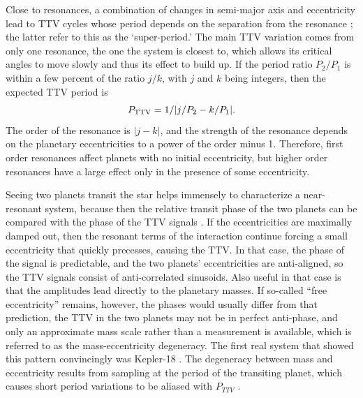 \documentclass[graybox,natbib,nosecnum]{svmult}
\begin{document}
Close to resonances, a combination of changes in semi-major axis and eccentricity lead to TTV cycles whose period depends on the separation from the resonance \citep{Steffen2006,2012ApJ...761..122L}; the latter refer to this as the `super-period.'  The main TTV variation comes from only one resonance, the one the system is closest to, which allows its critical angles to move slowly and thus its effect to build up.  If the period ratio $P_2/P_1$ is within a few percent of the ratio $j/k$, with $j$ and $k$ being integers, then the expected TTV period is 
\begin{equation}
P_{\rm TTV} = 1/|j/P_2-k/P_1|. \label{eqn:pttv}
\end{equation}
The order of the resonance is $|j-k|$, and the strength of the resonance depends on the planetary eccentricities to a power of the order minus 1.  Therefore, first order resonances affect planets with no initial eccentricity, but higher order resonances have a large effect only in the presence of some eccentricity. 

Seeing two planets transit the star helps immensely to characterize a near-resonant system, because then the relative transit phase of the two planets can be compared with the phase of the TTV signals \citep{2012ApJ...761..122L}.  If the eccentricities are maximally damped out, then the resonant terms of the interaction continue forcing a small eccentricity that quickly precesses, causing the TTV.  In that case, the phase of the signal is predictable, and the two planets' eccentricities are anti-aligned, so the TTV signals consist of anti-correlated sinusoids.  Also useful in that case is that the amplitudes lead directly to the planetary masses.  If so-called ``free eccentricity'' remains, however, the phases would usually differ from that prediction, the TTV in the two planets may not be in perfect anti-phase, and only an approximate mass scale rather than a measurement is available, which is referred to as the mass-eccentricity degeneracy.  The first real system that showed this pattern convincingly was Kepler-18 \citep{2011ApJS..197....7C}. %
The degeneracy between mass and eccentricity results from sampling at the period of the transiting planet, which causes short period variations to be aliased with $P_{TTV}$ \citep{2012ApJ...761..122L,2015ApJ...802..116D}.  
\end{document}
